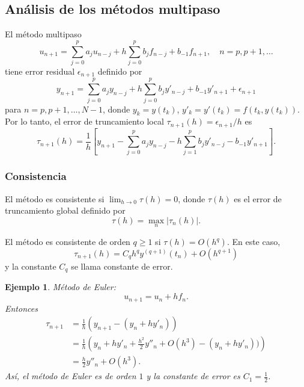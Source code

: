 \documentclass[11pt,letterpaper]{report}
\newtheorem{example}{Ejemplo}
\begin{document}
\subsection{Análisis de los métodos multipaso}
El método multipaso
\begin{equation}
  u_{n+1}
  =
  \sum_{j=0}^{p}a_ju_{n-j}
  +
  h
  \sum_{j=0}^{p}b_jf_{n-j} + b_{-1}f_{n+1},
  \quad
  n=p, p+1,\dots
\end{equation}
tiene error residual $\epsilon_{n+1}$ definido por
\begin{equation}
  y_{n+1}
  =
  \sum_{j=0}^{p}a_jy_{n-j}
  +
  h
  \sum_{j=0}^{p}b_jy'_{n-j} + b_{-1}y'_{n+1}
  +\epsilon_{n+1}
\end{equation}
para $n=p, p+1,\dots,N-1$, donde $y_{k}=y(t_{k})$,
$y'_{k}=y'(t_{k})=f(t_{k},y(t_{k}))$.
Por lo tanto, el error de truncamiento local
$\tau_{n+1}(h) = \epsilon_{n+1}/h$ es
\begin{equation}
  \tau_{n+1}(h)
  =
  \frac{1}{h}
  \left[
    y_{n+1}
    -
    \sum_{j=0}^{p} a_jy_{n-j}
    -
    h
    \sum_{j=1}^{p}b_{j}y'_{n-j}
    -
    b_{-1}y'_{n+1}
  \right]
.\end{equation}

\subsubsection{Consistencia}

El método es consistente si $\lim_{h\to 0}\tau(h)=0$, donde $\tau(h)$
es el error de truncamiento global definido por
\begin{equation}
  \tau(h) = \max_n |\tau_{n}(h)|
.\end{equation}

El método es consistente de orden $q\geq 1$ si $\tau(h)=O(h^{q})$.
En este caso,
\begin{equation}
  \tau_{n+1}(h) = C_qh^qy^{(q+1)}(t_n) + O(h^{q+1})
\end{equation}
y la constante $C_q$ se llama constante de error.

\begin{example}
  Método de Euler:
  \begin{equation}
    u_{n+1} = u_{n} + hf_n
  .\end{equation}
  Entonces
  \begin{align}
    \tau_{n+1}
    &= \frac{1}{h}(y_{n+1} - (y_n+hy'_n)) \\
    &= \frac{1}{h}
    \left(
    y_n + hy'_n + \frac{h^{2}}{2} y''_n + O(h^{3})
    - (y_n + hy'_n))
    \right)
    \\
    &= \frac{h}{2}y''_n + O(h^{3})
  .\end{align}
  Así, el método de Euler es de orden $1$ y la constante de error es
  $C_1=\frac{1}{2}$.
\end{example}
\end{document}
